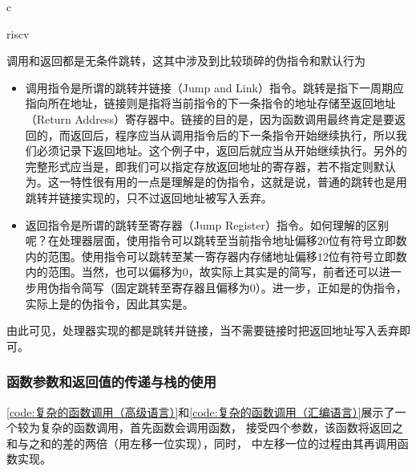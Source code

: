 \begin{Code}{c}
    
\end{Code}

\begin{Code}{riscv}
    
\end{Code}

调用和返回都是无条件跳转，这其中涉及到比较琐碎的伪指令和默认行为
\begin{itemize}
    \item 调用指令是所谓的跳转并链接（Jump and Link）指令。跳转是指下一周期应指向所在地址，链接则是指将当前指令的下一条指令的地址存储至返回地址（Return Address）寄存器中。链接的目的是，因为函数调用最终肯定是要返回的，而返回后，程序应当从调用指令后的下一条指令开始继续执行，所以我们必须记录下返回地址。这个例子中，返回后就应当从开始继续执行。另外的完整形式应当是，即我们可以指定存放返回地址的寄存器，若不指定则默认为。这一特性很有用的一点是理解是的伪指令，这就是说，普通的跳转也是用跳转并链接实现的，只不过返回地址被写入丢弃。
    \item 返回指令是所谓的跳转至寄存器（Jump Register）指令。如何理解的区别呢？在处理器层面，使用指令可以跳转至当前指令地址偏移$20$位有符号立即数内的范围。使用指令可以跳转至某一寄存器内存储地址偏移$12$位有符号立即数内的范围。当然，也可以偏移为$0$，故实际上其实是的简写，前者还可以进一步用伪指令简写（固定跳转至寄存器且偏移为$0$）。进一步，正如是的伪指令，实际上是的伪指令，因此其实是。
\end{itemize}

由此可见，处理器实现的都是跳转并链接，当不需要链接时把返回地址写入丢弃即可。

\subsubsection{函数参数和返回值的传递与栈的使用}
\cref{code:复杂的函数调用（高级语言）}和\cref{code:复杂的函数调用（汇编语言）}展示了一个较为复杂的函数调用，首先函数会调用函数， 接受四个参数，该函数将返回之和与之和的差的两倍（用左移一位实现），同时， 中左移一位的过程由其再调用函数实现。

